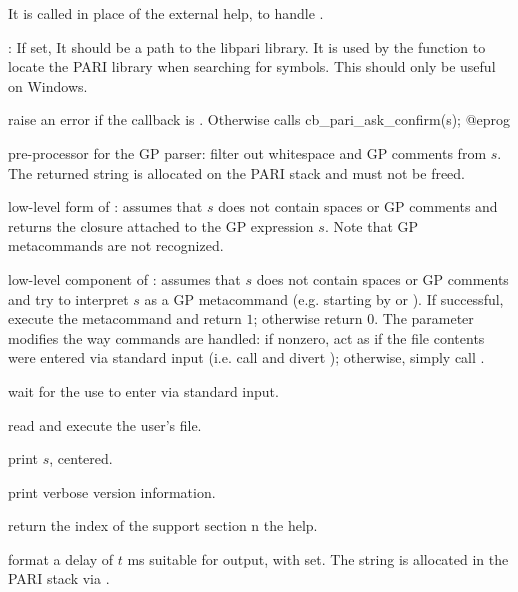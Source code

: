 It is called in place of the external help, to handle .


: If set, It should be a path to the libpari library.
It is used by the function  to locate the PARI library when
searching for symbols.  This should only be useful on Windows.


 raise an error if the
callback  is . Otherwise
calls
\bprog
  cb_pari_ask_confirm(s);
@eprog

 pre-processor for the GP
parser: filter out whitespace and GP comments from $s$. The returned string
is allocated on the PARI stack and must not be freed.

 low-level form of
: assumes that $s$ does not contain spaces or GP comments and
returns the closure attached to the GP expression $s$. Note
that GP metacommands are not recognized.

 low-level component of
: assumes that $s$ does not contain spaces or GP comments and
try to interpret $s$ as a GP metacommand (e.g. starting by \kbd{\bs} or
). If successful, execute the metacommand and return $1$; otherwise
return $0$. The  parameter modifies the way  commands
are handled: if nonzero, act as if the file contents were entered via
standard input (i.e. call  and divert );
otherwise, simply call .

 wait for the use to enter 
via standard input.

 read and execute the user's  file.

 print $s$, centered.

 print verbose version information.

 return the index of the support section
n the help.

 format a delay of $t$ ms
suitable for  output, with  set. The string is allocated
in the PARI stack via .

